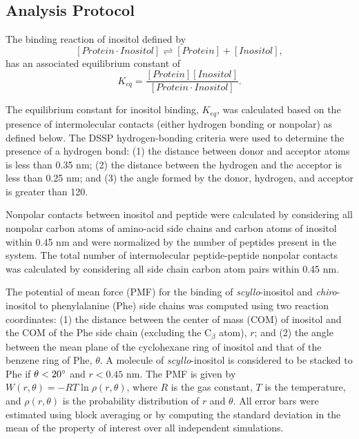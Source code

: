 \subsection{Analysis Protocol}

The binding reaction of inositol defined by 
\[\left[ Protein\cdot Inositol \right] \rightleftharpoons \left[ Protein \right] +\left[ Inositol \right], \]
has an associated equilibrium constant of 
\[ K_{eq} = \frac{\left[ Protein \right]\left[ Inositol \right]}{\left[Protein \cdot Inositol\right]}.\] 

The equilibrium constant for inositol binding, $K_{eq}$, was calculated based on the presence of intermolecular contacts (either hydrogen bonding or nonpolar) as defined below. The DSSP hydrogen-bonding criteria were used to determine the presence of a hydrogen bond: (1) the distance between donor and acceptor atoms is less than 0.35 nm; (2) the distance between the hydrogen and the acceptor is less than 0.25 nm; and (3) the angle formed by the donor, hydrogen, and acceptor is greater than 120\degreesymb.\cite{Kabsch:1983p31} 

Nonpolar contacts between inositol and peptide were calculated by considering all nonpolar carbon atoms of amino-acid side chains and carbon atoms of inositol within 0.45 nm and were normalized by the number of peptides present in the system. The total number of intermolecular peptide-peptide nonpolar contacts was calculated by considering all side chain carbon atom pairs within 0.45 nm.

The potential of mean force (PMF) for the binding of  \emph{scyllo}-inositol and  \emph{chiro}-inositol to phenylalanine (Phe) side chains was computed using two reaction coordinates: (1) the distance between the center of mass (COM) of inositol and the COM of the Phe side chain (excluding the C$_{\beta}$ atom), $r$; and (2) the angle between the mean plane of the cyclohexane ring of inositol and that of the benzene ring of Phe, $\theta$. A molecule of \emph{scyllo}-inositol is considered to be stacked to Phe if $\theta < 20^\circ$ and $r < 0.45$ nm. The PMF is given by $\mathit{W(r, \theta)}=-RT\ln\rho\left(r,\theta\right)$, 
where $R$ is the gas constant, $T$ is the temperature, and $\rho\left(r,\theta\right)$ is the probability distribution of $r$ and $\theta$. All error bars were estimated using block averaging or by computing the standard deviation in the mean of the property of interest over all independent simulations.

